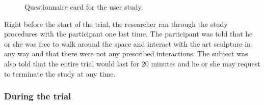 \begin{figure} [!htb]
	\centering
	\caption[Questionnaire card for the user study]{Questionnaire card for the user study.}
	\label{fig:Questionaire-Card2}
\end{figure}

Right before the start of the trial, the researcher ran through the study procedures with the participant one last time. The participant was told that he or she was free to walk around the space and interact with the art sculpture in any way and that there were not any prescribed interactions. The subject was also told that the entire trial would last for 20 minutes and he or she may request to terminate the study at any time.


\subsubsection{During the trial}

